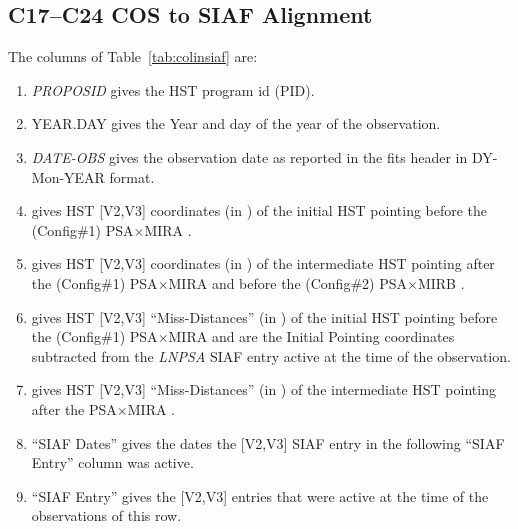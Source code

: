 \subsection{C17--C24 COS to SIAF Alignment \label{subsec:siafalign}}


The columns of Table~\ref{tab:colinsiaf} are:
\footnotesize
\begin{enumerate}
\item \textit{PROPOSID} gives the HST program id (PID).
\item YEAR.DAY gives the Year and day of the year of the observation.
\item \textit{DATE-OBS} gives the observation date as reported in the
fits header in DY-Mon-YEAR format.
\item gives HST [V2,V3] coordinates (in \arcsec) of
the initial HST pointing before the (Config\#1) PSA$\times$MIRA .
\item gives HST [V2,V3] coordinates (in \arcsec) of
the intermediate HST pointing after the (Config\#1) PSA$\times$MIRA 
and before the (Config\#2) PSA$\times$MIRB .
\item gives HST [V2,V3] ``Miss-Distances'' (in \arcsec) of
the initial HST pointing before the (Config\#1) PSA$\times$MIRA 
and are the Initial Pointing coordinates subtracted from the \textit{LNPSA}
SIAF entry active at the time of the observation.
\item gives HST [V2,V3] ``Miss-Distances'' (in \arcsec) of
the intermediate HST pointing after the PSA$\times$MIRA .
\item ``SIAF Dates'' gives the dates the [V2,V3] SIAF entry in the following ``SIAF Entry'' column was active.
\item ``SIAF Entry'' gives the [V2,V3] entries that were active at the time
of the observations of this row.
\end{enumerate}
\normalsize


